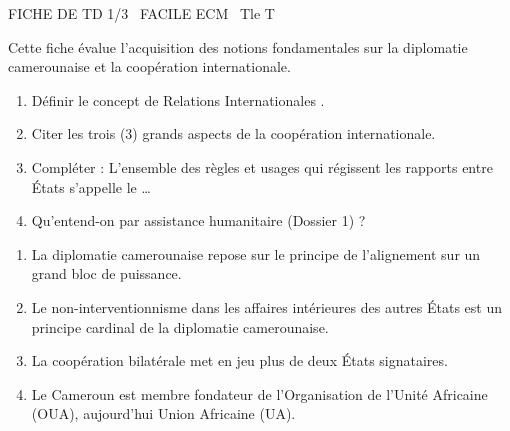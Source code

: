 \documentclass[11pt]{article}
\begin{document}
\begin{tcolorbox}[enhanced,colback=popink,colframe=popink,arc=10pt,boxrule=0pt,left=12pt,right=12pt,top=9pt,bottom=9pt]
{\color{white}\popxbold\small FICHE DE TD 1/3 \textbullet\ FACILE \hfill ECM \textbullet\ Tle T\par}
\end{tcolorbox}
\vspace{4pt}
Cette fiche évalue l'acquisition des notions fondamentales sur la diplomatie camerounaise et la coopération internationale.

\begin{exercice}
\begin{enumerate}
    \item Définir le concept de \og Relations Internationales \fg{}.
    \item Citer les trois (3) grands aspects de la coopération internationale.
    \item Compléter : L'ensemble des règles et usages qui régissent les rapports entre États s'appelle le \ldots
    \item Qu'entend-on par \og assistance humanitaire \fg{} (Dossier 1) ?
\end{enumerate}
\end{exercice}

\begin{exercice}
\begin{enumerate}
    \item La diplomatie camerounaise repose sur le principe de l'alignement sur un grand bloc de puissance.
    \item Le non-interventionnisme dans les affaires intérieures des autres États est un principe cardinal de la diplomatie camerounaise.
    \item La coopération bilatérale met en jeu plus de deux États signataires.
    \item Le Cameroun est membre fondateur de l'Organisation de l'Unité Africaine (OUA), aujourd'hui Union Africaine (UA).
\end{enumerate}
\end{exercice}
\end{document}
